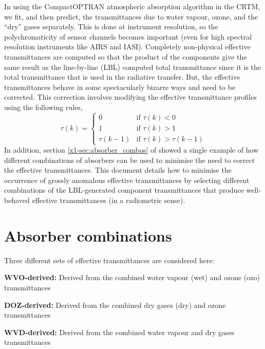 In using the CompactOPTRAN atmospheric absorption algorithm in the CRTM, we fit, and then predict, the transmittances due to water vapour, ozone, and the ``dry'' gases separately. This is done at instrument resolution, so the polychromaticity of sensor channels becomes important (even for high spectral resolution instruments like AIRS and IASI). Completely non-physical effective transmittances are computed so that the product of the components give the same result as the line-by-line (LBL) computed total transmittance since it is the total transmittance that is used in the radiative transfer. But, the effective transmittances behave in some spectacularly bizarre ways and need to be corrected. This correction involves modifying the effective transmittance profiles using the following rules,
\begin{equation}
  \tau(k) = \begin{cases}
               0         & \textrm{if } \tau(k) < 0\\
               1         & \textrm{if } \tau(k) > 1\\
               \tau(k-1) & \textrm{if } \tau(k) > \tau(k-1)
            \end{cases}
  \label{eqn:fix_efftau}
\end{equation}
In addition, section \ref{x1-sec:absorber_combos} of \cite{ref:crtm_idoc1} showed a single example of how different combinations of absorbers can be used to minimise the need to correct the effective transmittances. This document details how to minimise the occurrence of grossly anomalous effective transmittances by selecting different combinations of the LBL-generated component transmittances that produce well-behaved effective transmittances (in a radiometric sense). 


\section{Absorber combinations}
Three different sets of effective transmittances are considered here:
\begin{list}{\bfseries}
  {\setlength{\labelwidth}{1.2in}
   \setlength{\leftmargin}{1.2in}
   \setlength{\labelsep}{0.1in}
   \setlength{\parsep}{0.5ex plus0.2ex minus0.1ex}
   \setlength{\itemsep}{0ex plus0.2ex}}
  \item[\bfseries WVO-derived:] Derived from the combined water vapour (wet) and ozone (ozo) transmittances
  \item[\bfseries DOZ-derived:] Derived from the combined dry gases (dry) and ozone transmittances
  \item[\bfseries WVD-derived:] Derived from the combined water vapour and dry gases transmittances
\end{list}

